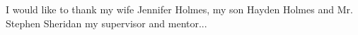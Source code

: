 \def\baselinestretch{1.0}


I would like to thank my wife Jennifer Holmes, my son Hayden Holmes and Mr. Stephen Sheridan my supervisor and mentor...